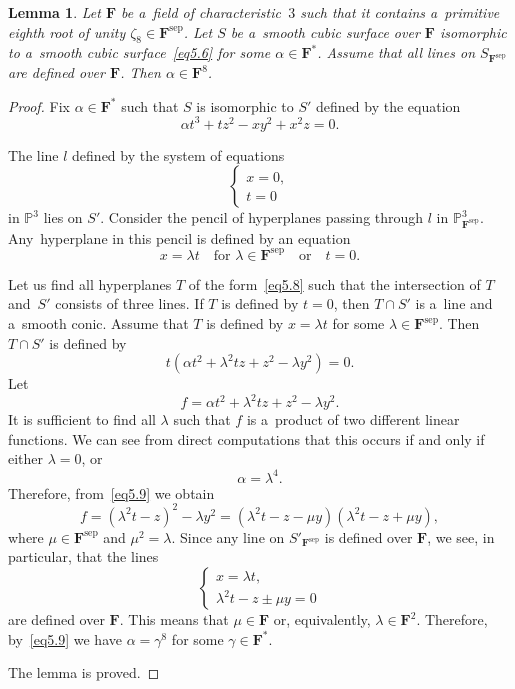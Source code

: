 \documentclass{amsart}
\numberwithin{equation}{section}
\theoremstyle{plain}
\newtheorem{lemma}{Lemma}
\theoremstyle{definition}
\theoremstyle{remark}
\begin{document}
\begin{lemma}
\label{l31}
Let $\mathbf{F}$ be a~field of characteristic~$3$ such that it contains a~primitive eighth root of unity $\zeta_8 \in \mathbf{F}^{\mathrm{sep}}$. Let $S$ be a~smooth cubic surface over $\mathbf{F}$ isomorphic to a~smooth cubic surface~\eqref{eq5.6} for some $\alpha \in \mathbf{F}^*$. Assume that all lines on $S_{\mathbf{F}^{\mathrm{sep}}}$ are defined over $\mathbf{F}$. Then $\alpha \in \mathbf{F}^8$.
\end{lemma}

\begin{proof}
Fix $\alpha \in \mathbf{F}^*$ such that $S$ is isomorphic to $S'$ defined by the equation
$$
\alpha t^3+tz^2-xy^2+x^2z=0.
$$

The line $l$ defined by the system of equations
$$
\begin{cases}
x=0,\\
t=0
\end{cases}
$$ in $\mathbb{P}^3$
lies on $S'$. Consider the pencil of hyperplanes passing through $l$ in $\mathbb{P}^3_{\mathbf{F}^{\mathrm{sep}}}$. Any~hyperplane in this pencil is defined by an equation
\begin{equation}
\label{eq5.8}
x=\lambda t
\quad\text{for } \lambda \in \mathbf{F}^{\mathrm{sep}}
\quad\text{or}\quad t=0.
\end{equation}

Let us find all hyperplanes $T$ of the form~\eqref{eq5.8} such that the intersection of $T$ and~$S'$ consists of three lines. If $T$ is defined by $t=0$, then $T \cap S'$ is a~line and a~smooth conic. Assume that $T$ is defined by $x=\lambda t$ for some $ \lambda \in \mathbf{F}^{\mathrm{sep}}$. Then~$T \cap S'$ is defined by
$$
t(\alpha t^2+\lambda^2 tz +z^2-\lambda y^2)=0.
$$
Let
$$
f=\alpha t^2+\lambda^2 tz +z^2-\lambda y^2.
$$
It is sufficient to find all $\lambda$ such that $f$ is a~product of two different linear functions. We can see from direct computations that this occurs if and only if either $\lambda =0$, or
\begin{equation}
\label{eq5.9}
\alpha=\lambda^4.
\end{equation}
Therefore, from~\eqref{eq5.9} we obtain
$$
f=(\lambda^2t-z)^2-\lambda y^2=(\lambda^2 t-z-\mu y)(\lambda^2 t-z+\mu y),
$$
where $\mu \in \mathbf{F}^{\mathrm{sep}}$ and $\mu^2=\lambda$. Since any line on $S'_{\mathbf{F}^{\mathrm{sep}}}$ is defined over $\mathbf{F}$, we see, in particular, that the lines
$$
\begin{cases}
x=\lambda t,\\
\lambda^2 t-z \pm \mu y=0
\end{cases}
$$
are defined over $\mathbf{F}$. This means that $\mu \in \mathbf{F}$ or, equivalently, $\lambda \in \mathbf{F}^2$. Therefore, by~\eqref{eq5.9} we have $\alpha=\gamma^8$ for some $\gamma \in \mathbf{F}^*$.

The lemma is proved.
\end{proof}
\end{document}
